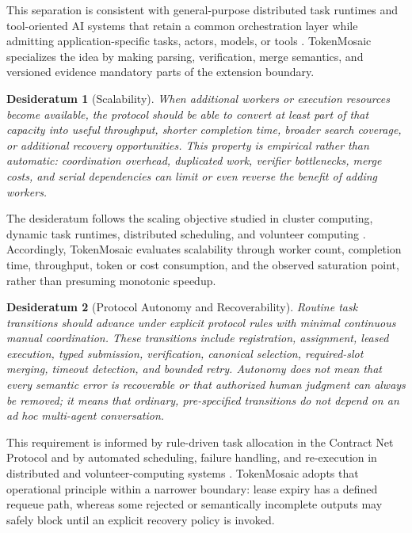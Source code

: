\documentclass{article}
\theoremstyle{plain}
\newtheorem{desideratum}{Desideratum}
\begin{document}
This separation is consistent with general-purpose distributed task runtimes
and tool-oriented AI systems that retain a common orchestration layer while
admitting application-specific tasks, actors, models, or tools
\citep{moritz2018ray,shen2023hugginggpt,wu2023autogen}. TokenMosaic specializes
the idea by making parsing, verification, merge semantics, and versioned
evidence mandatory parts of the extension boundary.


\begin{desideratum}[Scalability]
When additional workers or execution resources become available, the protocol
should be able to convert at least part of that capacity into useful throughput,
shorter completion time, broader search coverage, or additional recovery
opportunities. This property is empirical rather than automatic: coordination
overhead, duplicated work, verifier bottlenecks, merge costs, and serial
dependencies can limit or even reverse the benefit of adding workers.
\end{desideratum}

The desideratum follows the scaling objective studied in cluster computing,
dynamic task runtimes, distributed scheduling, and volunteer computing
\citep{dean2004mapreduce,moritz2018ray,ousterhout2013sparrow,anderson2020boinc}.
Accordingly, TokenMosaic evaluates scalability through worker count, completion
time, throughput, token or cost consumption, and the observed saturation point,
rather than presuming monotonic speedup.


\begin{desideratum}[Protocol Autonomy and Recoverability]
Routine task transitions should advance under explicit protocol rules with
minimal continuous manual coordination. These transitions include registration,
assignment, leased execution, typed submission, verification, canonical
selection, required-slot merging, timeout detection, and bounded retry. Autonomy
does not mean that every semantic error is recoverable or that authorized human
judgment can always be removed; it means that ordinary, pre-specified transitions
do not depend on an ad hoc multi-agent conversation.
\end{desideratum}

This requirement is informed by rule-driven task allocation in the Contract Net
Protocol and by automated scheduling, failure handling, and re-execution in
distributed and volunteer-computing systems
\citep{smith1980contract,dean2004mapreduce,anderson2020boinc}. TokenMosaic adopts
that operational principle within a narrower boundary: lease expiry has a
defined requeue path, whereas some rejected or semantically incomplete outputs
may safely block until an explicit recovery policy is invoked.
\end{document}
